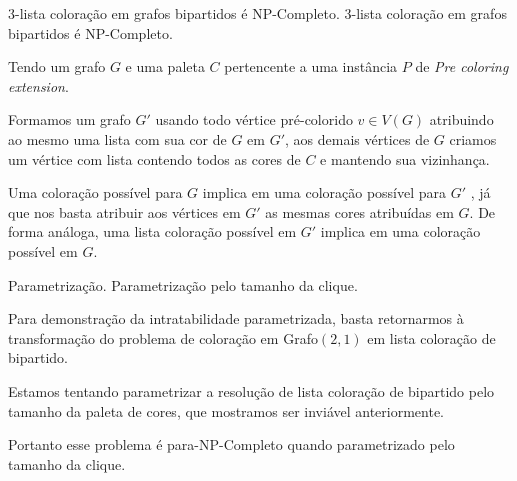 \documentclass[9pt, compress]{beamer}
\newcommand{\?}{\textcolor{warn}{\textit{?}}}
\begin{document}
     \begin{frame}{3-lista coloração em grafos bipartidos é NP-Completo.}
    \large{3-lista coloração em grafos bipartidos é NP-Completo.}
      \normalsize\newline\newline
            
      Tendo um grafo $G$ e uma paleta $C$ pertencente a uma instância $P$ de \emph{Pre coloring extension}.
      
      Formamos um grafo $G'$ usando todo vértice pré-colorido $v \in V(G)$ atribuindo ao mesmo uma lista com sua cor de $G$ em $G'$, aos demais vértices de $G$ criamos um vértice com lista contendo todos as cores de $C$ e mantendo sua vizinhança.
      
      Uma coloração possível para $G$ implica em uma coloração possível para $G'$ , já que nos basta atribuir aos vértices em $G'$ as mesmas cores atribuídas em $G$. De forma análoga, uma lista coloração possível em $G'$ implica em uma coloração possível em $G$.
      
      
     \end{frame}
     \begin{frame}{Parametrização.}
    \large{Parametrização pelo tamanho da clique.}
      \normalsize\newline\newline
            
      Para demonstração da intratabilidade parametrizada, basta retornarmos à transformação do problema de coloração em Grafo$(2,1)$ em lista coloração de bipartido.
      
      Estamos tentando parametrizar a resolução de lista coloração de bipartido pelo tamanho da paleta de cores, que mostramos ser inviável anteriormente.
      
      Portanto esse problema é para-NP-Completo quando parametrizado pelo tamanho da clique.
      
     \end{frame}
\end{document}

